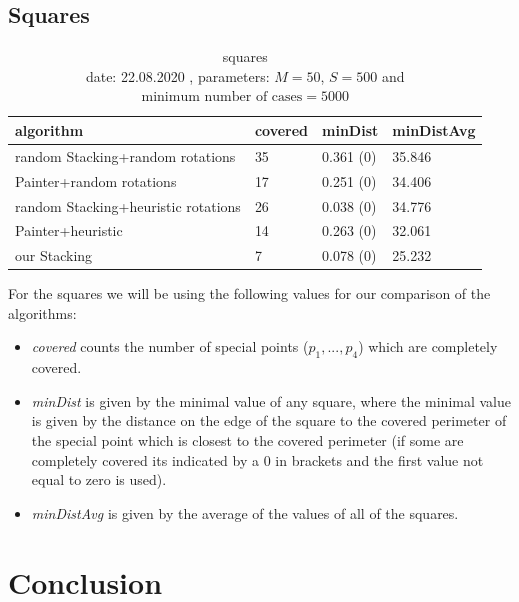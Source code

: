 \documentclass[a4paper,11pt]{article}
\begin{document}
\subsection*{Squares}
\begin{table}[h]
  \begin{center}
    \begin{tabular}{| l || l | l | l|  }
      \hline
      algorithm & covered & minDist & minDistAvg \\
      \hline

      random Stacking+random rotations & 35 &  0.361 (0) & 35.846\\

      Painter+random rotations & 17 &  0.251 (0) & 34.406\\


      random Stacking+heuristic rotations & 26  & 0.038 (0)& 34.776\\

      Painter+heuristic & 14 & 0.263 (0)& 32.061\\

      our Stacking & 7 &  0.078 (0)& 25.232\\


      \hline
    \end{tabular}
  \end{center}
  \caption{squares\\
  date: 22.08.2020  , parameters: $M=50$, $S=500$ and $\text{minimum number of cases}=5000$  }

\end{table}

For the squares we will be using the following values for our comparison of the algorithms:
\begin{itemize}
  \item \textit{covered} counts the number of special points ($p_1,...,p_4$) which are completely covered.
  \item \textit{minDist} is given by the minimal value of any square, where the minimal value is given by the distance on the edge of the square to the covered perimeter of the special point which is closest to the covered perimeter (if some are completely covered its indicated by a 0 in brackets and the first value not equal to zero is used).
  \item \textit{minDistAvg} is given by the average of the values of all of the squares.
\end{itemize}


\section{Conclusion}
\end{document}
